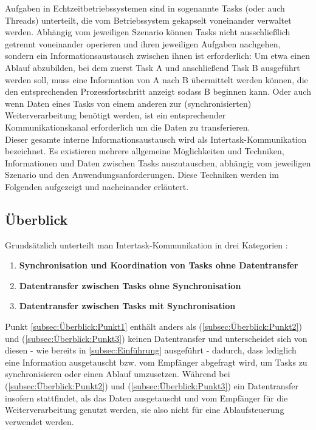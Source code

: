 \documentclass{llncs}
\begin{document}
Aufgaben in Echtzeitbetriebssystemen sind in sogenannte Tasks (oder auch Threads) unterteilt, die vom Betriebssystem gekapselt voneinander verwaltet werden. Abhängig vom jeweiligen Szenario können Tasks nicht ausschließlich getrennt voneinander operieren und ihren jeweiligen Aufgaben nachgehen, sondern ein Informationsaustausch zwischen ihnen ist erforderlich: Um etwa einen Ablauf abzubilden, bei dem zuerst Task A und anschließend Task B ausgeführt werden soll, muss eine Information von A nach B übermittelt werden können, die den entsprechenden Prozessfortschritt anzeigt sodass B beginnen kann. Oder auch wenn Daten eines Tasks von einem anderen zur (synchronisierten) Weiterverarbeitung benötigt werden, ist ein entsprechender Kommunikationskanal erforderlich um die Daten zu transferieren.\\

Dieser gesamte interne Informationsaustausch wird als Intertask-Kommunikation bezeichnet. Es existieren mehrere allgemeine Möglichkeiten und Techniken, Informationen und Daten zwischen Tasks auszutauschen, abhängig vom jeweiligen Szenario und den Anwendungsanforderungen. Diese Techniken werden im Folgenden aufgezeigt und nacheinander erläutert.

\subsection{Überblick}
\label{subsec:Überblick}
Grundsätzlich unterteilt man Intertask-Kommunikation in drei Kategorien \autocite[vgl.][79]{Cooling2017}:
\begin{enumerate}
	\setlength\itemsep{0.5em} %
	\item \textbf{Synchronisation und Koordination von Tasks ohne Datentransfer}  \label{subsec:Überblick:Punkt1}
	\item \textbf{Datentransfer zwischen Tasks ohne Synchronisation} \label{subsec:Überblick:Punkt2}
	\item \textbf{Datentransfer zwischen Tasks mit Synchronisation} \label{subsec:Überblick:Punkt3}
\end{enumerate}
Punkt \ref{subsec:Überblick:Punkt1} enthält anders als (\ref{subsec:Überblick:Punkt2}) und (\ref{subsec:Überblick:Punkt3}) keinen Datentransfer und unterscheidet sich von diesen - wie bereits in \ref{subsec:Einführung} ausgeführt - dadurch, dass lediglich eine Information ausgetauscht bzw. vom Empfänger abgefragt wird, um Tasks zu synchronisieren oder einen Ablauf umzusetzen. Während bei (\ref{subsec:Überblick:Punkt2}) und (\ref{subsec:Überblick:Punkt3}) ein Datentransfer insofern stattfindet, als das Daten ausgetauscht und vom Empfänger für die Weiterverarbeitung genutzt werden, sie also nicht für eine Ablaufsteuerung verwendet werden. 
\end{document}
